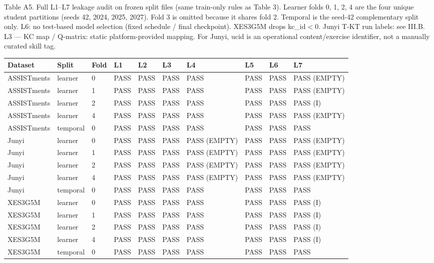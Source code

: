 \documentclass[10pt,a4paper]{article}
\begin{document}
\vspace{0.55em}
\noindent\begin{minipage}{\textwidth}
\centering
{\fontsize{8}{9.5}\selectfont Table A5. Full L1--L7 leakage audit on frozen split files (same train-only rules as Table 3). Learner folds 0, 1, 2, 4 are the four unique student partitions (seeds 42, 2024, 2025, 2027). Fold 3 is omitted because it shares fold 2. Temporal is the seed-42 complementary split only. L6: no test-based model selection (fixed schedule / final checkpoint). XES3G5M drops kc\_id$<$0. Junyi T-KT run labels: see III.B. L3 --- KC map / Q-matrix: static platform-provided mapping. For Junyi, ucid is an operational content/exercise identifier, not a manually curated skill tag.\par}
\vspace{0.35em}
\begin{adjustbox}{max width=\textwidth}
{\small
\begin{tabular}{@{}llllllllll@{}}
\toprule
Dataset & Split & Fold & L1 & L2 & L3 & L4 & L5 & L6 & L7 \\
\midrule
ASSISTments & learner & 0 & PASS & PASS & PASS & PASS & PASS & PASS & PASS (EMPTY) \\
ASSISTments & learner & 1 & PASS & PASS & PASS & PASS & PASS & PASS & PASS (EMPTY) \\
ASSISTments & learner & 2 & PASS & PASS & PASS & PASS & PASS & PASS & PASS (I) \\
ASSISTments & learner & 4 & PASS & PASS & PASS & PASS & PASS & PASS & PASS (EMPTY) \\
ASSISTments & temporal & 0 & PASS & PASS & PASS & PASS & PASS & PASS & PASS \\
Junyi & learner & 0 & PASS & PASS & PASS & PASS (EMPTY) & PASS & PASS & PASS (EMPTY) \\
Junyi & learner & 1 & PASS & PASS & PASS & PASS (EMPTY) & PASS & PASS & PASS (EMPTY) \\
Junyi & learner & 2 & PASS & PASS & PASS & PASS (EMPTY) & PASS & PASS & PASS (EMPTY) \\
Junyi & learner & 4 & PASS & PASS & PASS & PASS (EMPTY) & PASS & PASS & PASS (EMPTY) \\
Junyi & temporal & 0 & PASS & PASS & PASS & PASS & PASS & PASS & PASS \\
XES3G5M & learner & 0 & PASS & PASS & PASS & PASS & PASS & PASS & PASS (I) \\
XES3G5M & learner & 1 & PASS & PASS & PASS & PASS & PASS & PASS & PASS (I) \\
XES3G5M & learner & 2 & PASS & PASS & PASS & PASS & PASS & PASS & PASS (I) \\
XES3G5M & learner & 4 & PASS & PASS & PASS & PASS & PASS & PASS & PASS (I) \\
XES3G5M & temporal & 0 & PASS & PASS & PASS & PASS & PASS & PASS & PASS \\
\bottomrule
\end{tabular}}
\end{adjustbox}
\end{minipage}
\end{document}

